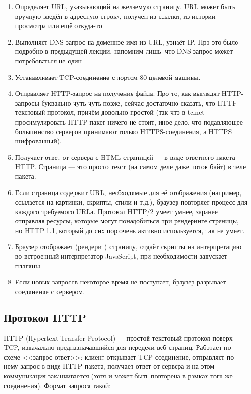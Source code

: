 \documentclass{../../text-style}
\begin{document}
\begin{enumerate}
    \item Определяет URL, указывающий на желаемую страницу. URL может быть вручную введён в адресную строку, получен из ссылки, из истории просмотра или ещё откуда-то.
    \item Выполняет DNS-запрос на доменное имя из URL, узнаёт IP. Про это было подробно в предыдущей лекции, напомним лишь, что DNS-запрос может потребоваться не один.
    \item Устанавливает TCP-соединение с портом 80 целевой машины.
    \item Отправляет HTTP-запрос на получение файла. Про то, как выглядят HTTP-запросы буквально чуть-чуть позже, сейчас достаточно сказать, что HTTP --- текстовый протокол, причём довольно простой (так что в telnet просимулировать HTTP-пакет ничего не стоит, иное дело, что подавляющее большинство серверов принимают только HTTPS-соединения, а HTTPS шифрованный).
    \item Получает ответ от сервера с HTML-страницей --- в виде ответного пакета HTTP. Страница --- это просто текст (на самом деле даже поток байт) в теле пакета.
    \item Если страница содержит URL, необходимые для её отображения (например, ссылается на картинки, скрипты, стили и т.д.), браузер повторяет процесс для каждого требуемого URLа. Протокол HTTP/2 умеет умнее, заранее отправляя ресурсы, которые могут понадобиться при рендеринге страницы, но HTTP 1.1, который до сих пор очень активно используется, так не умеет.
    \item Браузер отображает (рендерит) страницу, отдаёт скрипты на интерпретацию во встроенный интерпретатор JavaScript, при необходимости запускает плагины.
    \item Если новых запросов некоторое время не поступает, браузер разрывает соединение с сервером.
\end{enumerate}

\subsection{Протокол HTTP}

HTTP (Hypertext Transfer Protocol) --- простой текстовый протокол поверх TCP, изначально предназначавшийся для передечи веб-страниц. Работает по схеме <<запрос-ответ>>: клиент открывает TCP-соединение, отправляет по нему запрос в виде HTTP-пакета, получает ответ от сервера и на этом коммуникация заканчивается (хотя и может быть повторена в рамках того же соединения). Формат запроса такой:
\end{document}
